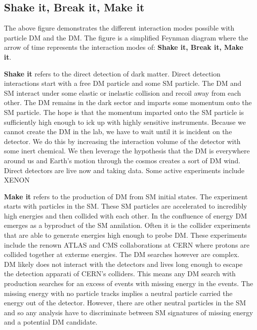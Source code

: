 \subsection{Shake it, Break it, Make it\label{sec:bop_it}}


The above figure demonstrates the different interaction modes possible with particle DM and the DM.
The figure is a simplified Feynman diagram where the arrow of time represents the interaction modes of: \textbf{Shake it, Break it, Make it}.

\textbf{Shake it} refers to the direct detection of dark matter.
Direct detection interactions start with a free DM particle and some SM particle.
The DM and SM interact under some elastic or inelastic collision and recoil away from each other.
The DM remains in the dark sector and imparts some momentum onto the SM particle.
The hope is that the momentum imparted onto the SM particle is sufficiently high enough to ick up with highly sensitive instruments.
Because we cannot create the DM in the lab, we have to wait until it is incident on the detector.
We do this by increasing the interaction volume of the detector with some inert chemical.
We then leverage the hypothesis that the DM is everywhere around us and Earth's motion through the cosmos creates a sort of DM wind.
Direct detectors are live now and taking data.
Some active experiments include XENON 


\textbf{Make it} refers to the production of DM from SM initial states.
The experiment starts with particles in the SM.
These SM particles are accelerated to incredibly high energies and then collided with each other.
In the confluence of energy DM emerges as a byproduct of the SM annilation.
Often it is the collider experiments that are able to generate energies high enough to probe DM.
These experiments include the renown ATLAS and CMS collaborations at CERN where protons are collided together at exterme energies.
The DM searches however are complex.
DM likely does not interact with the detectors and lives long enough to escape the detection apparati of CERN's colliders.
This means any DM search with production searches for an excess of events with missing energy in the events.
The missing energy with no particle tracks implies a neutral particle carried the energy out of the detector.
However, there are other neutral particles in the SM and so any analysis have to discriminate between SM signatures of missing energy and a potential DM candidate.

